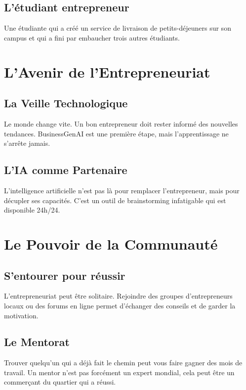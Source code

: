 \documentclass[12pt,a4paper]{report}
\begin{document}
\section{L'étudiant entrepreneur}
Une étudiante qui a créé un service de livraison de petits-déjeuners sur son campus et qui a fini par embaucher trois autres étudiants.

\newpage

\chapter{L'Avenir de l'Entrepreneuriat}

\section{La Veille Technologique}
Le monde change vite. Un bon entrepreneur doit rester informé des nouvelles tendances. BusinessGenAI est une première étape, mais l'apprentissage ne s'arrête jamais.

\section{L'IA comme Partenaire}
L'intelligence artificielle n'est pas là pour remplacer l'entrepreneur, mais pour décupler ses capacités. C'est un outil de brainstorming infatigable qui est disponible 24h/24.

\newpage

\chapter{Le Pouvoir de la Communauté}

\section{S'entourer pour réussir}
L'entrepreneuriat peut être solitaire. Rejoindre des groupes d'entrepreneurs locaux ou des forums en ligne permet d'échanger des conseils et de garder la motivation.

\section{Le Mentorat}
Trouver quelqu'un qui a déjà fait le chemin peut vous faire gagner des mois de travail. Un mentor n'est pas forcément un expert mondial, cela peut être un commerçant du quartier qui a réussi.
\end{document}
